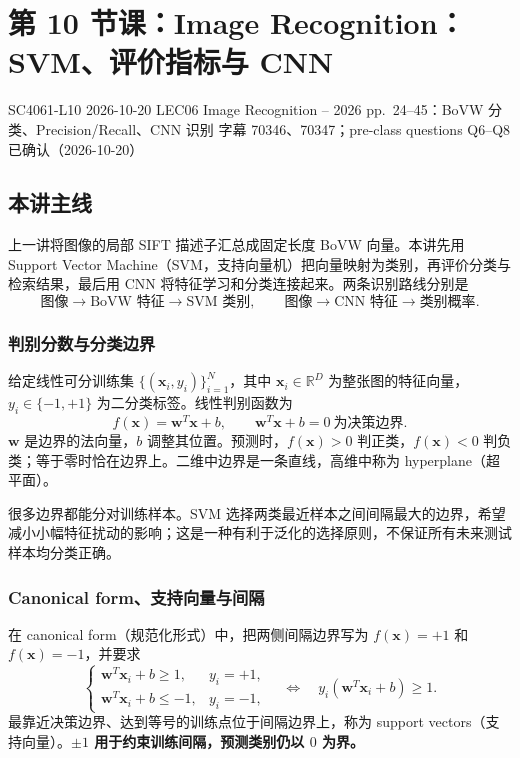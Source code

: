 
\section{第 10 节课：Image Recognition：SVM、评价指标与 CNN}
\label{lecture:SC4061-L10}

\lecturemeta
  {SC4061-L10}
  {2026-10-20}
  {LEC06 Image Recognition -- 2026}
  {pp.~24--45：BoVW 分类、Precision/Recall、CNN 识别}
  {字幕 70346、70347；pre-class questions Q6--Q8}
  {已确认（2026-10-20）}

\subsection{本讲主线}

上一讲将图像的局部 SIFT 描述子汇总成固定长度 BoVW 向量。本讲先用 Support Vector Machine（SVM，支持向量机）把向量映射为类别，再评价分类与检索结果，最后用 CNN 将特征学习和分类连接起来。两条识别路线分别是
\[
  \text{图像}\to\text{BoVW 特征}\to\text{SVM 类别},
  \qquad
  \text{图像}\to\text{CNN 特征}\to\text{类别概率}.
\]

\subsubsection*{判别分数与分类边界}

给定线性可分训练集 $\{(\bm x_i,y_i)\}_{i=1}^{N}$，其中 $\bm x_i\in\mathbb R^D$ 为整张图的特征向量，$y_i\in\{-1,+1\}$ 为二分类标签。线性判别函数为
\[
  f(\bm x)=\bm w^T\bm x+b,
  \qquad \boxed{\bm w^T\bm x+b=0\ \text{为决策边界}}.
\]
$\bm w$ 是边界的法向量，$b$ 调整其位置。预测时，$f(\bm x)>0$ 判正类，$f(\bm x)<0$ 判负类；等于零时恰在边界上。二维中边界是一条直线，高维中称为 hyperplane（超平面）。

很多边界都能分对训练样本。SVM 选择两类最近样本之间间隔最大的边界，希望减小小幅特征扰动的影响；这是一种有利于泛化的选择原则，不保证所有未来测试样本均分类正确。

\subsubsection*{Canonical form、支持向量与间隔}

在 canonical form（规范化形式）中，把两侧间隔边界写为 $f(\bm x)=+1$ 和 $f(\bm x)=-1$，并要求
\[
  \begin{cases}
    \bm w^T\bm x_i+b\geq1,&y_i=+1,\\
    \bm w^T\bm x_i+b\leq-1,&y_i=-1,
  \end{cases}
  \quad\Longleftrightarrow\quad
  \boxed{y_i(\bm w^T\bm x_i+b)\geq1}.
\]
最靠近决策边界、达到等号的训练点位于间隔边界上，称为 support vectors（支持向量）。\textbf{$\pm1$ 用于约束训练间隔，预测类别仍以 $0$ 为界。}

